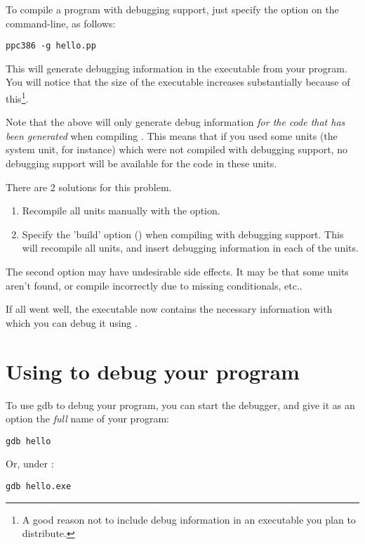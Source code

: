 \documentclass{book}
\begin{document}
To compile a program with debugging support, just specify the 
option on the command-line, as follows:
\begin{verbatim}
ppc386 -g hello.pp
\end{verbatim}
This will generate debugging information in the executable from your
program. You will notice that the size of the executable increases
substantially because of this\footnote{A good reason not to include debug
information in an executable you plan to distribute.}.

Note that the above will only generate debug information {\em for the code
that has been generated} when compiling . This means that if
you used some units (the system unit, for instance) which were not compiled
with debugging support, no debugging support will be available for the code
in these units.

There are 2 solutions for this problem.
\begin{enumerate}
\item Recompile all units manually with the  option.
\item Specify the 'build' option () when compiling with debugging
support. This will recompile all units, and insert debugging information in
each of the units.
\end{enumerate}
The second option may have undesirable side effects. It may be that some
units aren't found, or compile incorrectly due to missing conditionals,
etc..

If all went well, the executable now contains the necessary information with
which you can debug it using \gnu {}.


\section{Using  to debug your program}

To use gdb to debug your program, you can start the debugger, and give it as
an option the {\em full} name of your program:
\begin{verbatim}
gdb hello
\end{verbatim}
Or, under \dos :
\begin{verbatim}
gdb hello.exe
\end{verbatim}
\end{document}

